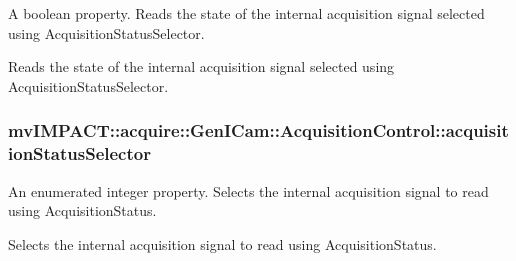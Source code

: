 A boolean property. Reads the state of the internal acquisition signal selected using Acquisition\+Status\+Selector. 

Reads the state of the internal acquisition signal selected using Acquisition\+Status\+Selector. \hypertarget{classmv_i_m_p_a_c_t_1_1acquire_1_1_gen_i_cam_1_1_acquisition_control_aadb492cee15f403d411a927ccdc6195f}{
\subsubsection[{acquisition\+Status\+Selector}]{ mv\+I\+M\+P\+A\+C\+T\+::acquire\+::\+Gen\+I\+Cam\+::\+Acquisition\+Control\+::acquisition\+Status\+Selector}}\label{classmv_i_m_p_a_c_t_1_1acquire_1_1_gen_i_cam_1_1_acquisition_control_aadb492cee15f403d411a927ccdc6195f}


An enumerated integer property. Selects the internal acquisition signal to read using Acquisition\+Status. 

Selects the internal acquisition signal to read using Acquisition\+Status.

